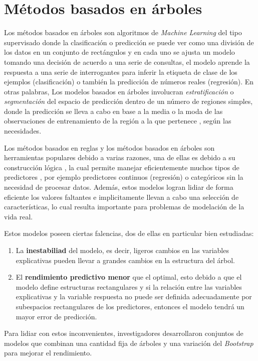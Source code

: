 %
%
%
%
\section{Métodos basados en árboles}

Los métodos basados en árboles son algoritmos de \textit{Machine Learning} del tipo supervisado donde la  
clasificación o predicción se puede ver como una división de los datos en un conjunto de rectángulos \cite{13} y en
cada uno se ajusta un modelo tomando una decisión de acuerdo a una serie de consultas, el modelo
aprende la respuesta a una serie de interrogantes para inferir la etiqueta de clase de los
ejemplos (clasificación) o también la predicción de números reales (regresión). En otras palabras, 
Los modelos basados en árboles involucran \textit{estratificación} o \textit{segmentación} del 
espacio de predicción dentro de un número de regiones simples, donde la predicción se lleva a cabo 
en base a la media o la moda de las observaciones de entrenamiento de la región a la que pertenece \cite{14}, según las necesidades.

Los métodos basados en reglas y los métodos basados en árboles son herramientas populares debido a varias razones,
una de ellas es debido a su construcción lógica \cite{18}, la cual permite manejar eficientemente muchos tipos de predictores
, por ejemplo predictores continuos (regresión) o categóricos sin la necesidad de procesar datos. Además,
estos modelos logran lidiar de forma eficiente los valores faltantes e implicitamente llevan a cabo una selección de características,
lo cual resulta importante para problemas de modelación de la vida real.

Estos modelos poseen ciertas falencias, dos de ellas en particular bien estudiadas:
\newpage
\begin{enumerate}
    \item La \textbf{inestabiliad} del modelo, es decir, ligeros cambios en las variables explicativas 
          pueden llevar a grandes cambios en la estructura del árbol.
    \item El \textbf{rendimiento predictivo menor} que el optimal, esto debido a que el modelo define estructuras rectangulares y si 
          la relación entre las variables explicativas y la variable respuesta no puede ser definida adecuadamente por
          subespacios rectangulares de los predictores, entonces el modelo tendrá un mayor error de predicción.
\end{enumerate} 


Para lidiar con estos inconvenientes, investigadores desarrollaron conjuntos de modelos que combinan una cantidad fija de árboles
y una variación del \textit{Bootstrap} para mejorar el rendimiento.

